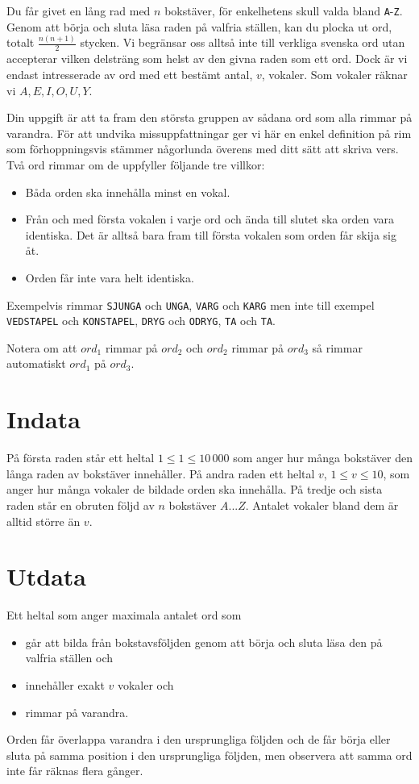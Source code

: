 
Du får givet en lång rad med $n$ bokstäver, för enkelhetens skull valda bland \texttt{A}-\texttt{Z}. Genom att börja och sluta läsa raden på valfria ställen, kan du plocka ut ord, totalt $\frac{n(n+1)}{2}$ stycken. Vi begränsar oss alltså inte till verkliga svenska ord utan accepterar vilken delsträng som helst av den givna raden som ett ord. Dock är vi endast intresserade av ord med ett bestämt antal, $v$, vokaler. Som vokaler räknar vi $A, E, I, O, U, Y$.

Din uppgift är att ta fram den största gruppen av sådana ord som alla rimmar på varandra. För att undvika missuppfattningar ger vi här en enkel definition på rim som förhoppningsvis stämmer någorlunda överens med ditt sätt att skriva vers. Två ord rimmar om de uppfyller följande tre villkor:

\begin{itemize}
	\item Båda orden ska innehålla minst en vokal.
	\item Från och med första vokalen i varje ord och ända till slutet ska orden vara identiska. Det är alltså bara fram till första vokalen som orden får skija sig åt.
	\item Orden får inte vara helt identiska.
\end{itemize}

Exempelvis rimmar \texttt{SJUNGA} och \texttt{UNGA}, \texttt{VARG} och \texttt{KARG} men inte till exempel \texttt{VEDSTAPEL} och \texttt{KONSTAPEL}, \texttt{DRYG} och \texttt{ODRYG}, \texttt{TA} och \texttt{TA}.

Notera om att $ord_1$ rimmar på $ord_2$ och $ord_2$ rimmar på $ord_3$ så rimmar automatiskt $ord_1$ på $ord_3$.

\section*{Indata}
På första raden står ett heltal $1 \le 1 \le 10\,000$ som anger hur många bokstäver den långa raden av bokstäver innehåller. På andra raden ett heltal $v$, $1 \le v \le 10$, som anger hur många vokaler de bildade orden ska innehålla. På tredje och sista raden står en obruten följd av $n$ bokstäver $A...Z$. Antalet vokaler bland dem är alltid större än $v$.

\section*{Utdata}
Ett heltal som anger maximala antalet ord som
\begin{itemize}
	\item går att bilda från bokstavsföljden genom att börja och sluta läsa den på valfria ställen och
	\item innehåller exakt $v$ vokaler och
	\item rimmar på varandra.
\end{itemize}
Orden får överlappa varandra i den ursprungliga följden och de får börja eller sluta på samma position i den ursprungliga följden, men observera att samma ord inte får räknas flera gånger.
